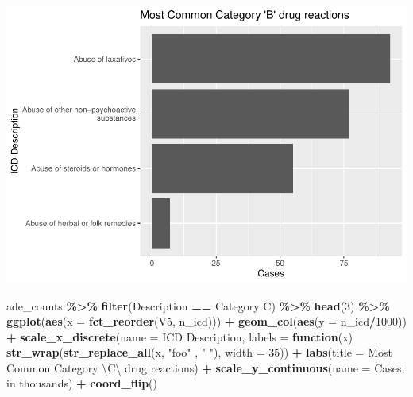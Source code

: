 \documentclass[preprint, 3p,
authoryear]{elsarticle} %
\newenvironment{Shaded}{\begin{snugshade}}{\end{snugshade}}
\newcommand{\CharTok}[1]{\textcolor[rgb]{0.31,0.60,0.02}{#1}}
\newcommand{\ControlFlowTok}[1]{\textcolor[rgb]{0.13,0.29,0.53}{\textbf{#1}}}
\newcommand{\DataTypeTok}[1]{\textcolor[rgb]{0.13,0.29,0.53}{#1}}
\newcommand{\DecValTok}[1]{\textcolor[rgb]{0.00,0.00,0.81}{#1}}
\newcommand{\KeywordTok}[1]{\textcolor[rgb]{0.13,0.29,0.53}{\textbf{#1}}}
\newcommand{\NormalTok}[1]{#1}
\newcommand{\OperatorTok}[1]{\textcolor[rgb]{0.81,0.36,0.00}{\textbf{#1}}}
\newcommand{\StringTok}[1]{\textcolor[rgb]{0.31,0.60,0.02}{#1}}
\begin{document}
\includegraphics{final-project-paper_files/figure-latex/top-10-ade-cat-ab-2.pdf}

\begin{Shaded}
\begin{Highlighting}[]
\NormalTok{ade\_counts }\OperatorTok{\%\textgreater{}\%}
\StringTok{  }\KeywordTok{filter}\NormalTok{(Description }\OperatorTok{==}\StringTok{ \textquotesingle{}Category C\textquotesingle{}}\NormalTok{) }\OperatorTok{\%\textgreater{}\%}
\StringTok{  }\KeywordTok{head}\NormalTok{(}\DecValTok{3}\NormalTok{) }\OperatorTok{\%\textgreater{}\%}
\StringTok{  }\KeywordTok{ggplot}\NormalTok{(}\KeywordTok{aes}\NormalTok{(}\DataTypeTok{x =} \KeywordTok{fct\_reorder}\NormalTok{(V5, n\_icd))) }\OperatorTok{+}
\StringTok{  }\KeywordTok{geom\_col}\NormalTok{(}\KeywordTok{aes}\NormalTok{(}\DataTypeTok{y =}\NormalTok{ n\_icd}\OperatorTok{/}\DecValTok{1000}\NormalTok{)) }\OperatorTok{+}\StringTok{ }
\StringTok{  }\KeywordTok{scale\_x\_discrete}\NormalTok{(}\DataTypeTok{name =} \StringTok{\textquotesingle{}ICD Description\textquotesingle{}}\NormalTok{, }\DataTypeTok{labels =} \ControlFlowTok{function}\NormalTok{(x) }\KeywordTok{str\_wrap}\NormalTok{(}\KeywordTok{str\_replace\_all}\NormalTok{(x, }\StringTok{"foo"}\NormalTok{ , }\StringTok{" "}\NormalTok{),}
                                                 \DataTypeTok{width =} \DecValTok{35}\NormalTok{)) }\OperatorTok{+}
\StringTok{  }\KeywordTok{labs}\NormalTok{(}\DataTypeTok{title =} \StringTok{\textquotesingle{}Most Common Category }\CharTok{\textbackslash{}\textquotesingle{}}\StringTok{C}\CharTok{\textbackslash{}\textquotesingle{}}\StringTok{ drug reactions\textquotesingle{}}\NormalTok{) }\OperatorTok{+}
\StringTok{  }\KeywordTok{scale\_y\_continuous}\NormalTok{(}\DataTypeTok{name =} \StringTok{\textquotesingle{}Cases, in thousands\textquotesingle{}}\NormalTok{) }\OperatorTok{+}
\StringTok{  }\KeywordTok{coord\_flip}\NormalTok{() }
\end{Highlighting}
\end{Shaded}
\end{document}

